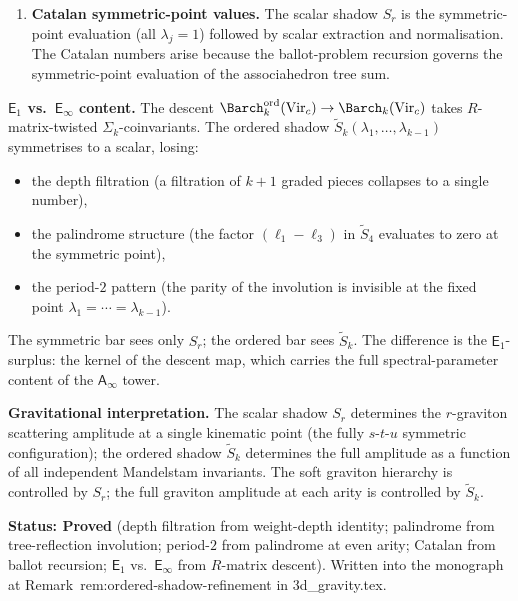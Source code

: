 \documentclass[11pt]{article}
\newcommand{\Eone}{\mathsf{E}_1}
\newcommand{\Einf}{\mathsf{E}_{\infty}}
\newcommand{\Ainf}{\mathsf{A}_{\infty}}
\begin{document}
\begin{enumerate}[label=\textbf{(\roman*)},leftmargin=2.5em]
\item \textbf{Catalan symmetric-point values.}
The scalar shadow $S_r$ is the symmetric-point evaluation
(all $\lambda_j = 1$) followed by scalar extraction and
normalisation.  The Catalan numbers arise because the
ballot-problem recursion governs the symmetric-point
evaluation of the associahedron tree sum.
\end{enumerate}

\medskip
\textbf{$\Eone$ vs.\ $\Einf$ content.}
The descent
$\Barch^{\mathrm{ord}}_k(\mathrm{Vir}_c) \to
\Barch_k(\mathrm{Vir}_c)$
takes $R$-matrix-twisted $\Sigma_k$-coinvariants.  The ordered
shadow $\widetilde{S}_k(\lambda_1, \ldots, \lambda_{k-1})$
symmetrises to a scalar, losing:
\begin{itemize}[nosep]
\item the depth filtration (a filtration of $k + 1$ graded pieces
  collapses to a single number),
\item the palindrome structure (the factor $(\ell_1 - \ell_3)$ in
  $\widetilde{S}_4$ evaluates to zero at the symmetric point),
\item the period-$2$ pattern (the parity of the involution is
  invisible at the fixed point $\lambda_1 = \cdots = \lambda_{k-1}$).
\end{itemize}
The symmetric bar sees only $S_r$; the ordered bar sees
$\widetilde{S}_k$.  The difference is the $\Eone$-surplus:
the kernel of the descent map, which carries the full
spectral-parameter content of the $\Ainf$ tower.

\medskip
\textbf{Gravitational interpretation.}
The scalar shadow $S_r$ determines the $r$-graviton scattering
amplitude at a single kinematic point (the fully $s$-$t$-$u$
symmetric configuration); the ordered shadow
$\widetilde{S}_k$ determines the full amplitude as a function
of all independent Mandelstam invariants.  The soft graviton
hierarchy is controlled by $S_r$; the full graviton amplitude
at each arity is controlled by $\widetilde{S}_k$.

\textbf{Status: Proved} (depth filtration from weight-depth
identity; palindrome from tree-reflection involution; period-$2$
from palindrome at even arity; Catalan from ballot recursion;
$\Eone$ vs.\ $\Einf$ from $R$-matrix descent).  Written into
the monograph at Remark~\textup{rem:ordered-shadow-refinement}
in 3d\_gravity.tex.
\end{document}
